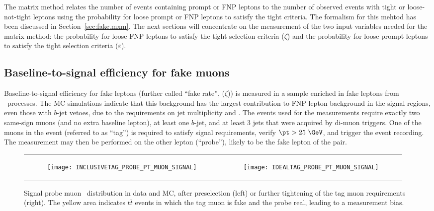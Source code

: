 The matrix method relates the number of events containing prompt or FNP leptons 
to the number of observed events with tight or loose-not-tight leptons 
using the probability for loose prompt or FNP leptons to satisfy the tight criteria.
The formalism for this mehtod has been discussed in Section~\ref{sec:fake.mxm}.
The next sections will concentrate on the measurement of the 
two input variables needed for the matrix method:
the probability for loose FNP leptons to satisfy the tight selection
criteria ($\zeta$) and 
the probability for loose prompt leptons to satisfy the tight selection 
criteria ($\varepsilon$).

\subsection*{Baseline-to-signal efficiency for fake muons}

Baseline-to-signal efficiency for fake leptons (further called ``fake rate'', ($\zeta$)) is measured 
in a sample enriched in fake leptons from \ttbar\ processes.
The MC simulations indicate that this background has the largest contribution to FNP lepton background in the signal regions, 
even those with $b$-jet vetoes, due to the requirements on jet multiplicity and \met. 
The events used for the measurements require exactly two same-sign muons (and no extra baseline lepton), 
at least one $b$-jet, and at least 3 jets that were acquired by di-muon triggers.
One of the muons in the event (referred to as ``tag'') is required to satisfy signal requirements, verify $\pt>25~\GeV$, 
and trigger the event recording. 
The measurement may then be performed on the other lepton (``probe''), likely to be the fake lepton of the pair. 

\begin{figure}[t!]
\centering
\begin{tabular}{rr}
\begin{subfigure}[t]{0.5\textwidth}\texttt{[image: INCLUSIVETAG\_PROBE\_PT\_MUON\_SIGNAL]}\caption{}\label{fig:bkg.mxm.INCLUSIVETAG_PROBE_PT_MUON_SIGNAL}\end{subfigure}&
\begin{subfigure}[t]{0.5\textwidth}\texttt{[image: IDEALTAG\_PROBE\_PT\_MUON\_SIGNAL]}\caption{}\label{fig:bkg.mxm.IDEALTAG_PROBE_PT_MUON_SIGNAL}\end{subfigure} \\
\end{tabular}
\caption
{Signal probe muon \pt\ distribution in data and MC, after preselection (left) 
or further tightening of the tag muon requirements (right).
The yellow area indicates $t\bar t$ events in which the tag muon is fake and the probe real, 
leading to a measurement bias. 
}
\label{Fig:fakes_preselection_muon}
\end{figure}

